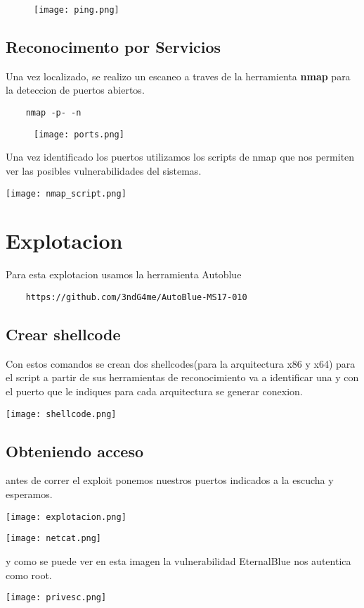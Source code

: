 \documentclass[a4paper]{article}%
\begin{document}
	\begin{figure}[h]
	\texttt{[image: ping.png]}
	\end{figure}

	\vspace{0.2cm}

	\subsection{Reconocimento por Servicios}
	
	Una vez localizado, se realizo un escaneo a traves de la herramienta \textbf{nmap}
	para la deteccion de puertos abiertos.

	\begin{verbatim}
	nmap -p- -n 
	\end{verbatim}

	\begin{figure}[h]
	\texttt{[image: ports.png]}
	\end{figure}

	Una vez identificado los puertos utilizamos los 
	scripts de nmap que nos permiten ver las 
	posibles vulnerabilidades del sistemas.

	\texttt{[image: nmap\_script.png]}


	\section{Explotacion}
	Para esta explotacion usamos la herramienta Autoblue

	\begin{verbatim}
	https://github.com/3ndG4me/AutoBlue-MS17-010
	\end{verbatim}

	\subsection{Crear shellcode}

	Con estos comandos se crean dos shellcodes(para la 
	arquitectura x86 y x64) para el script a partir de 
	sus herramientas de reconocimiento va a identificar 
	una y con el puerto que le indiques para 
	cada arquitectura se generar conexion.
	
	\texttt{[image: shellcode.png]}

	\subsection{Obteniendo acceso}

	antes de correr el exploit ponemos nuestros puertos 
	indicados a la escucha y esperamos.

	\newpage
	
	\texttt{[image: explotacion.png]}

	\texttt{[image: netcat.png]}

	y como se puede ver en esta imagen la vulnerabilidad
	EternalBlue nos autentica como root.
	
	\texttt{[image: privesc.png]}
		
\end{document}
